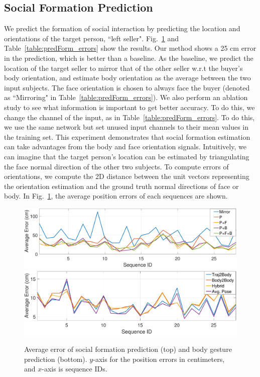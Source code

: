 \subsection{Social Formation Prediction}
We predict the formation of social interaction by predicting the location and orientations of the target person, ``left seller". Fig.~\ref{fig:predForm_errors} and Table~\ref{table:predForm_errors} show the results. Our method shows a 25 cm error in the prediction, which is better than a baseline. As the baseline, we predict the location of the target seller to mirror that of the other seller w.r.t the buyer's body orientation, and estimate body orientation as the average between the two input subjects. The face orientation is chosen to always face the buyer (denoted as ``Mirroring" in Table~\ref{table:predForm_errors}). We also perform an ablation study to see what information is important to get better accuracy. To do this, we change the channel of the input, as in Table~\ref{table:predForm_errors}. To do this, we use the same network  but set unused input channels to their mean values in the training set. This experiment demonstrates that social formation estimation can take advantages from the body and face orientation signals. Intuitively, we can imagine that the target person's location can be estimated by triangulating the face normal direction of the other two subjects. To compute errors of orientations, we compute the 2D distance between the unit vectors representing the orientation estimation and the ground truth normal directions of face or body. In Fig.~\ref{fig:predForm_errors}, the average position errors of each sequences are shown. 

\begin{figure}
	\centering
	\includegraphics[width=\linewidth]{ssp_fig/cvpr19_predForm}\\
	\includegraphics[width=\linewidth]{ssp_fig/cvpr19_predBody}
	\caption{Average error of social formation prediction (top) and body gesture prediction (bottom). $y$-axis for the position errors in centimeters, and $x$-axis is sequence IDs.} %
	\label{fig:predForm_errors}
\end{figure}


